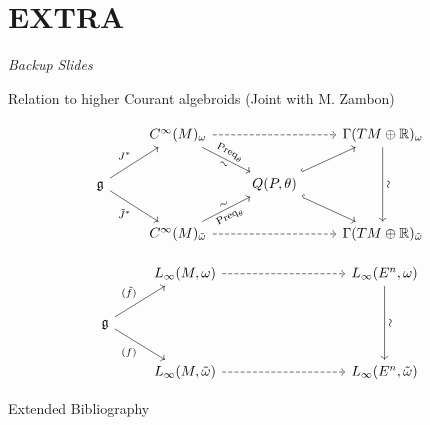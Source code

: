 \documentclass[handout,10pt]{beamer}
\begin{document}
  
\appendix
\section{EXTRA}
\begin{frame}
	\begin{center}
	\Huge\emph{Backup Slides}
	\end{center}
\end{frame}
\addtocounter{framenumber}{-1}


\begin{frame}[fragile]{Relation to higher Courant algebroids (Joint with M. Zambon)}

\begin{displaymath}
	\begin{tikzcd}
		&
		C^{\infty}(M)_\omega \ar[rr,dashed] \ar[dr,sloped,"\text{Preq}_\theta","\sim"']
		&
		&
		\Gamma(TM\oplus\mathbb{R})_\omega \ar[dd,sloped,"\sim"]
		\\
		\mathfrak{g} \ar[ur,"J^\ast"]\ar[dr,"\tilde{J}^\ast"']
		&
		&
		Q(P,\theta) \ar[ur,hook]\ar[dr,hook]
		&
		\\
		&
		C^{\infty}(M)_{\tilde{\omega}} \ar[rr,dashed] \ar[ur,sloped,"\text{Preq}_\theta"',"\sim"]
		&
		&
		\Gamma(TM\oplus\mathbb{R})_{\tilde{\omega}}		
	\end{tikzcd}
\end{displaymath}


\begin{displaymath}
	\begin{tikzcd}
		&
		L_{\infty}(M,\omega) \ar[rr,dashed] 
		&
		&
		L_\infty(E^n,\omega) \ar[dd,sloped,"\sim"]
		\\
		\mathfrak{g} \ar[ur,"(\tilde{f})"]\ar[dr,"(f)"']
		&
		&
		\phantom{		Q(P,\theta)}
		&
		\\
		&
		L_{\infty}(M,\tilde{\omega}) \ar[rr,dashed] 
		&
		&
		L_\infty(E^n,\tilde{\omega})	
	\end{tikzcd}
\end{displaymath}

\end{frame}


%
\begin{frame}[t,allowframebreaks]{Extended Bibliography}
	
	
\end{frame}

\end{document}
